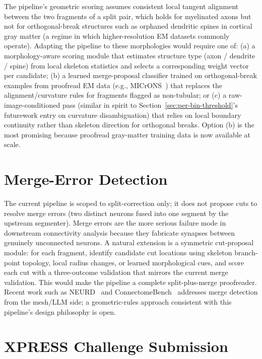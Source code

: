 The pipeline's geometric scoring assumes consistent local tangent alignment
between the two fragments of a split pair, which holds for myelinated axons
but not for orthogonal-break structures such as orphaned dendritic spines
in cortical gray matter (a regime in which higher-resolution EM datasets
commonly operate). Adapting the pipeline to these morphologies would
require one of: (a) a morphology-aware scoring module that estimates
structure type (axon / dendrite / spine) from local skeleton statistics
and selects a corresponding weight vector per candidate; (b) a learned
merge-proposal classifier trained on orthogonal-break examples from
proofread EM data (e.g., MICrONS~\cite{microns2025}) that replaces the
alignment/curvature rules for fragments flagged as non-tubular; or (c) a
raw-image-conditioned pass (similar in spirit to
Section~\ref{sec:per-bin-threshold}'s futurework entry on curvature
disambiguation) that relies on local boundary continuity rather than
skeleton direction for orthogonal breaks. Option (b) is the most
promising because proofread gray-matter training data is now available at
scale.

\section{Merge-Error Detection}

The current pipeline is scoped to split-correction only; it does not
propose cuts to resolve merge errors (two distinct neurons fused into
one segment by the upstream segmenter). Merge errors are the more serious
failure mode in downstream connectivity analysis because they fabricate
synapses between genuinely unconnected neurons. A natural extension is a
symmetric cut-proposal module: for each fragment, identify candidate cut
locations using skeleton branch-point topology, local radius changes, or
learned morphological cues, and score each cut with a three-outcome
validation that mirrors the current merge validation. This would make the
pipeline a complete split-plus-merge proofreader. Recent work such as
NEURD~\cite{celii2025neurd} and ConnectomeBench~\cite{brown2025connectomebench}
addresses merge detection from the mesh/LLM side; a geometric-rules
approach consistent with this pipeline's design philosophy is open.

\section{XPRESS Challenge Submission}

